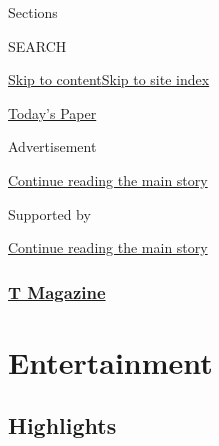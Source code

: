 Sections

SEARCH

\protect\hyperlink{site-content}{Skip to
content}\protect\hyperlink{site-index}{Skip to site index}

\href{https://myaccount.nytimes3xbfgragh.onion/auth/login?response_type=cookie\&client_id=vi}{}

\href{https://www.nytimes3xbfgragh.onion/section/todayspaper}{Today's
Paper}

Advertisement

\protect\hyperlink{after-top}{Continue reading the main story}

Supported by

\protect\hyperlink{after-sponsor}{Continue reading the main story}

\hypertarget{t-magazine}{%
\subsubsection{\texorpdfstring{\href{/section/t-magazine}{T
Magazine}}{T Magazine}}\label{t-magazine}}

\hypertarget{entertainment}{%
\section{Entertainment}\label{entertainment}}

\hypertarget{highlights}{%
\subsection{Highlights}\label{highlights}}

